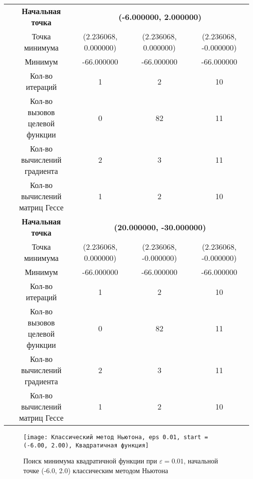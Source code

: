 \begin{table}[H]
\begin{tabular}{|c|c|c|c|c|}
	\cline{2-5}
	\hline
	\multirow{12}{*}{\rotatebox[origin=c]{90}{$\varepsilon = 1e-06$}}&\textbf{Начальная точка} &\multicolumn{3}{c|}{\textbf{(-6.000000, 2.000000)}}\\
	\cline{2-5}
	&Точка минимума &(2.236068, 0.000000) &(2.236068, 0.000000) &(2.236068, -0.000000) \\ 
	\cline{2-5}
	&Минимум &-66.000000 &-66.000000 &-66.000000 \\ 
	\cline{2-5}
	&Кол-во итераций &1 &2 &10 \\ 
	\cline{2-5}
	&\makecell{Кол-во вызовов\\целевой функции} &0 &82 &11 \\ 
	\cline{2-5}
	&\makecell{Кол-во вычислений\\градиента} &2 &3 &11 \\ 
	\cline{2-5}
	&\makecell{Кол-во вычислений\\матриц Гессе} &1 &2 &10 \\ 
	\cline{2-5}
\cline{2-5}&\textbf{Начальная точка} &\multicolumn{3}{c|}{\textbf{(20.000000, -30.000000)}}\\
	\cline{2-5}
	&Точка минимума &(2.236068, 0.000000) &(2.236068, -0.000000) &(2.236068, -0.000000) \\ 
	\cline{2-5}
	&Минимум &-66.000000 &-66.000000 &-66.000000 \\ 
	\cline{2-5}
	&Кол-во итераций &1 &2 &10 \\ 
	\cline{2-5}
	&\makecell{Кол-во вызовов\\целевой функции} &0 &82 &11 \\ 
	\cline{2-5}
	&\makecell{Кол-во вычислений\\градиента} &2 &3 &11 \\ 
	\cline{2-5}
	&\makecell{Кол-во вычислений\\матриц Гессе} &1 &2 &10 \\ 
	\cline{2-5}
	\hline

\end{tabular}
\end{table}


            \begin{figure}[H]
	        \centering
	        \texttt{[image: Классический метод Ньютона, eps 0.01, start = (-6.00, 2.00), Квадратичная функция]}%
	        \caption{Поиск минимума квадратичной функции при $\varepsilon = 0.01$, начальной точке (-6.0, 2.0) классическим методом Ньютона}
	        \vspace*{-1.2cm}
            \end{figure}
            

